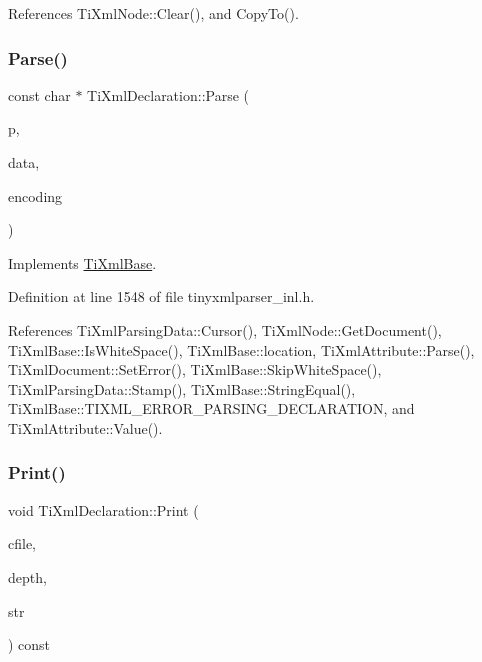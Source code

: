 References Ti\+Xml\+Node\+::\+Clear(), and Copy\+To().

\hypertarget{class_ti_xml_declaration_a9839ea97ed687a2b7342fd7b0f04361b}{}\label{class_ti_xml_declaration_a9839ea97ed687a2b7342fd7b0f04361b} 
\subsubsection{\texorpdfstring{Parse()}{Parse()}}
{\footnotesize\ttfamily const char $\ast$ Ti\+Xml\+Declaration\+::\+Parse (\begin{DoxyParamCaption}\item[{const char $\ast$}]{p,  }\item[{\hyperlink{class_ti_xml_parsing_data}{Ti\+Xml\+Parsing\+Data} $\ast$}]{data,  }\item[{\hyperlink{tinyxml_8h_a88d51847a13ee0f4b4d320d03d2c4d96}{Ti\+Xml\+Encoding}}]{encoding }\end{DoxyParamCaption})\hspace{0.3cm}{\ttfamily [virtual]}}



Implements \hyperlink{class_ti_xml_base_a00e4edb0219d00a1379c856e5a1d2025}{Ti\+Xml\+Base}.



Definition at line 1548 of file tinyxmlparser\+\_\+inl.\+h.



References Ti\+Xml\+Parsing\+Data\+::\+Cursor(), Ti\+Xml\+Node\+::\+Get\+Document(), Ti\+Xml\+Base\+::\+Is\+White\+Space(), Ti\+Xml\+Base\+::location, Ti\+Xml\+Attribute\+::\+Parse(), Ti\+Xml\+Document\+::\+Set\+Error(), Ti\+Xml\+Base\+::\+Skip\+White\+Space(), Ti\+Xml\+Parsing\+Data\+::\+Stamp(), Ti\+Xml\+Base\+::\+String\+Equal(), Ti\+Xml\+Base\+::\+T\+I\+X\+M\+L\+\_\+\+E\+R\+R\+O\+R\+\_\+\+P\+A\+R\+S\+I\+N\+G\+\_\+\+D\+E\+C\+L\+A\+R\+A\+T\+I\+ON, and Ti\+Xml\+Attribute\+::\+Value().

\hypertarget{class_ti_xml_declaration_ace687d02a5a25a060ae3802abb1b3f55}{}\label{class_ti_xml_declaration_ace687d02a5a25a060ae3802abb1b3f55} 
\subsubsection{\texorpdfstring{Print()}{Print()}\hspace{0.1cm}{\footnotesize\ttfamily [1/2]}}
{\footnotesize\ttfamily void Ti\+Xml\+Declaration\+::\+Print (\begin{DoxyParamCaption}\item[{F\+I\+LE $\ast$}]{cfile,  }\item[{int}]{depth,  }\item[{\hyperlink{tinyxml_8h_a92bada05fd84d9a0c9a5bbe53de26887}{T\+I\+X\+M\+L\+\_\+\+S\+T\+R\+I\+NG} $\ast$}]{str }\end{DoxyParamCaption}) const\hspace{0.3cm}{\ttfamily [virtual]}}



